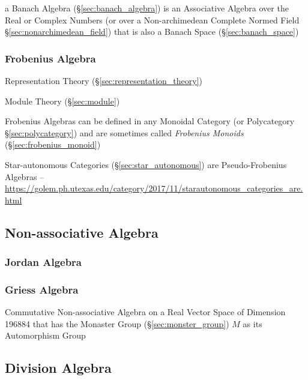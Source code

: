 a Banach Algebra (\S\ref{sec:banach_algebra}) is an Associative Algebra over
the Real or Complex Numbers (or over a Non-archimedean Complete Normed Field
\S\ref{sec:nonarchimedean_field}) that is also a Banach Space
(\S\ref{sec:banach_space})



\subsubsection{Frobenius Algebra}\label{sec:frobenius_algebra}

Representation Theory (\S\ref{sec:representation_theory})

Module Theory (\S\ref{sec:module})

Frobenius Algebras can be defined in any Monoidal Category (or
Polycategory \S\ref{sec:polycategory}) and are sometimes called
\emph{Frobenius Monoids} (\S\ref{sec:frobenius_monoid})

Star-autonomous Categories (\S\ref{sec:star_autonomous}) are Pseudo-Frobenius
Algebras
--\url{https://golem.ph.utexas.edu/category/2017/11/starautonomous_categories_are.html}



\subsection{Non-associative Algebra}
\label{sec:nonassociative_algebra}

\subsubsection{Jordan Algebra}\label{sec:jordan_algebra}

\subsubsection{Griess Algebra}\label{sec:griess_algebra}

Commutative Non-associative Algebra on a Real Vector Space of Dimension 196884
that has the Monaster Group (\S\ref{sec:monster_group}) $M$ as its Automorphism
Group



\subsection{Division Algebra}\label{sec:division_algebra}

